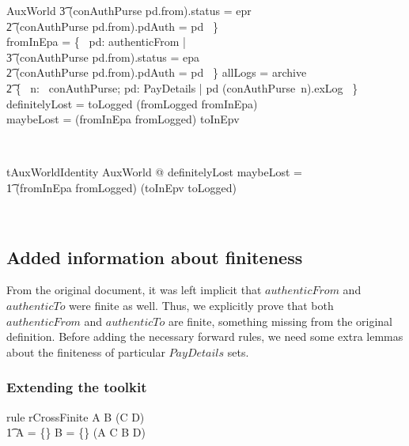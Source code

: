 \begin{LSDef}
\begin{schema}{AuxWorld}
          \t3 (conAuthPurse pd.from).status = epr \\
          \t2 \land (conAuthPurse pd.from).pdAuth = pd ~\} \\
   fromInEpa = \{~ pd: authenticFrom | \\
          \t3 (conAuthPurse pd.from).status = epa \\
          \t2 \land (conAuthPurse pd.from).pdAuth = pd ~\}
   \also
   allLogs = archive \cup \\
      \t2 \{~ n: \dom~conAuthPurse; pd: PayDetails | pd \in (conAuthPurse~n).exLog ~\}
   \also
   definitelyLost = toLogged \cap (fromLogged \cup fromInEpa) \\
   maybeLost = (fromInEpa \cup fromLogged) \cap toInEpv
\end{schema}~\end{LSDef}
%
\begin{LThm}
\begin{theorem}{tAuxWorldIdentity}
   \forall AuxWorld @ definitelyLost \cup maybeLost = \\
        \t1 (fromInEpa \cup fromLogged) \cap (toInEpv \cup toLogged)
\end{theorem}~\end{LThm}

\subsection{Added information about finiteness}


From the original document, it was left implicit that $authenticFrom$ and $authenticTo$ were finite as well.
Thus, we explicitly prove that both $authenticFrom$ and $authenticTo$ are finite, something missing from
the original definition. Before adding the necessary forward rules, we need some extra lemmas about the
finiteness of particular $PayDetails$ sets.

\subsubsection{Extending the toolkit}

\begin{LToolkit}
\begin{theorem}{rule rCrossFinite}
  A \cross B \in \finset (C \cross D) \iff \\\t1
  A = \{\} \lor B = \{\} \lor (A \in \finset C \land B \in \finset D)
\end{theorem}~\end{LToolkit}

